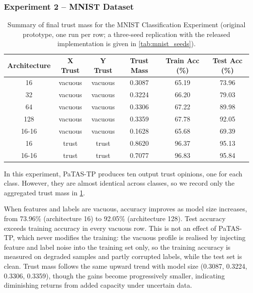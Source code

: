 \subsubsection*{Experiment 2 -- MNIST Dataset}
\begin{table}
\centering
\begin{tabular}{cccccc}
\hline
Architecture & X Trust & Y Trust & Trust Mass & Train Acc (\%) & Test Acc (\%) \\
\hline
16 & vacuous & vacuous & 0.3087 & 65.19 & 73.96 \\
32 & vacuous & vacuous & 0.3224 & 66.20 & 79.03 \\
64 & vacuous & vacuous & 0.3306 & 67.22 & 89.98 \\
128 & vacuous & vacuous & 0.3359 & 67.78 & 92.05 \\
16-16 & vacuous & vacuous & 0.1628 & 65.68 & 69.39 \\
16 & trust & trust & 0.8620 & 96.37 & 95.13 \\
16-16 & trust & trust & 0.7077 & 96.83 & 95.84 \\
\hline
\end{tabular}
\caption{Summary of final trust mass for the MNIST Classification Experiment (original prototype, one run per row; a three-seed replication with the released implementation is given in \cref{tab:mnist_seeds}).}
\label{tab:mnist}
\end{table}
In this experiment, \ac{PaTAS-TP} produces ten output trust opinions, one for each class. However, they are almost identical across classes, so we record only the aggregated trust mass in \cref{tab:mnist}.

When features and labels are vacuous, accuracy improves as model size increases, from 73.96\% (architecture 16) to 92.05\% (architecture 128). Test accuracy exceeds training accuracy in every vacuous row. This is not an effect of \ac{PaTAS-TP}, which never modifies the training: the vacuous profile is realised by injecting feature and label noise into the training set only, so the training accuracy is measured on degraded samples and partly corrupted labels, while the test set is clean. Trust mass follows the same upward trend with model size (0.3087, 0.3224, 0.3306, 0.3359), though the gains become progressively smaller, indicating diminishing returns from added capacity under uncertain data.

